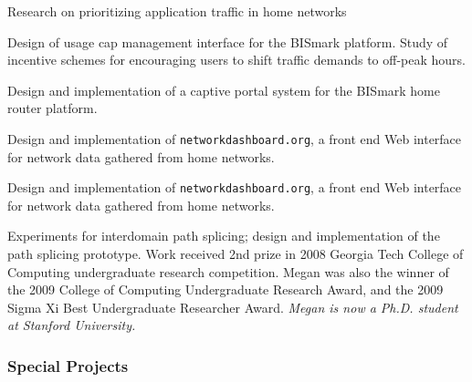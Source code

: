 \begin{description}

{
}{Research on prioritizing application traffic in home networks}

{Design of usage cap management interface for the BISmark platform.
  Study of incentive schemes for encouraging users to shift traffic
  demands to off-peak hours.}

{Design and implementation of a captive portal system for the BISmark
  home router platform.}

{Design and implementation of {\tt networkdashboard.org}, a front end
  Web interface for network data gathered from home networks.}

{Design and implementation of {\tt networkdashboard.org}, a front end
  Web interface for network data gathered from home networks.}




 {
   }{Experiments for interdomain path
  splicing; design and implementation of the path splicing prototype.
  Work received 2nd prize in 2008 Georgia Tech College of Computing
  undergraduate research competition. Megan was also the winner of the
  2009 College of Computing Undergraduate Research Award, and the 2009
  Sigma Xi Best Undergraduate Researcher Award. {\em Megan is now a
    Ph.D. student at Stanford University.}}

\end{description}


\subsubsection{Special Projects}

